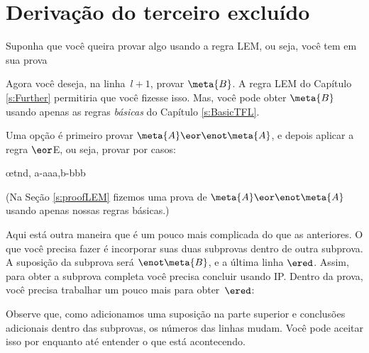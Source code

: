 \section{Derivação do terceiro excluído}
Suponha que você queira provar algo usando a regra LEM, ou seja, você tem em sua prova
 
\begin{fitchproof}
  \open
  \close
  \open
  \close
\end{fitchproof}
Agora você deseja, na linha~$l+1$, provar $\meta{B}$. A regra LEM do Capítulo \ref{s:Further} permitiria que você fizesse isso. Mas, você pode obter $\meta{B}$ usando apenas as regras  \emph{básicas} do Capítulo \ref{s:BasicTFL}.

Uma opção é primeiro provar  $\meta{A} \eor \enot\meta{A}$, e depois aplicar a regra $\eor$E, ou seja, provar por casos:
\begin{fitchproof}
  \open
  \close
  \open
  \close
  \ellipsesline
  \oe{tnd, a-aaa,b-bbb}
\end{fitchproof}
(Na Seção \ref{s:proofLEM} fizemos uma prova de $\meta{A} \eor \enot\meta{A}$  usando apenas nossas regras básicas.)

Aqui está outra maneira que é um pouco mais complicada do que as anteriores. O que você precisa fazer é incorporar suas duas subprovas dentro de outra subprova. A suposição da subprova será $\enot \meta{B}$, e a  última linha $\ered$. Assim,  para obter a subprova completa você precisa concluir  usando IP. Dentro da prova, você precisa trabalhar um pouco mais para obter~$\ered$:

\begin{fitchproof}
  \open
  \open
  \ellipsesline
  \close
  \open
  \ellipsesline
  \close
  \close
\end{fitchproof}
Observe que, como adicionamos uma suposição na parte superior e conclusões adicionais dentro das subprovas, os números das linhas mudam. Você pode aceitar isso por enquanto até entender o que está acontecendo.

